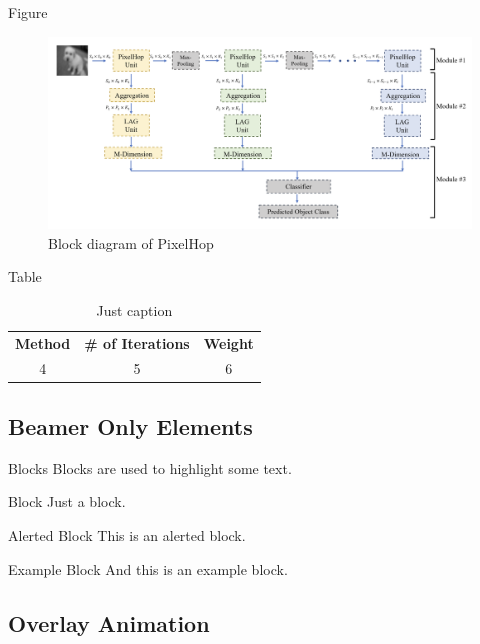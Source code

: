 \documentclass[10pt]{beamer}
\begin{document}
\begin{frame}{Figure}
    \begin{figure}
        \centering
        \includegraphics[width=.9\linewidth]{pixelhop.png}
        \caption{Block diagram of PixelHop}
        \label{fig:pixelhop}
    \end{figure}
\end{frame}

\begin{frame}{Table}
    \begin{table}
        \centering
        \begin{tabular}{ccc}
            \textbf{Method} & \textbf{\# of Iterations} & \textbf{Weight} \\
            4 & 5 & 6
        \end{tabular}
        \caption{Just caption}
        \label{tab:my_label}
    \end{table}
\end{frame}

\subsection{Beamer Only Elements}

\begin{frame}{Blocks}
  Blocks are used to highlight some text.
  \begin{block}{Block}
    Just a block.
  \end{block}
  \begin{alertblock}{Alerted Block}
    This is an alerted block.
  \end{alertblock}
  \begin{exampleblock}{Example Block}
    And this is an example block.
  \end{exampleblock}
\end{frame}

\subsection{Overlay Animation}
\end{document}
